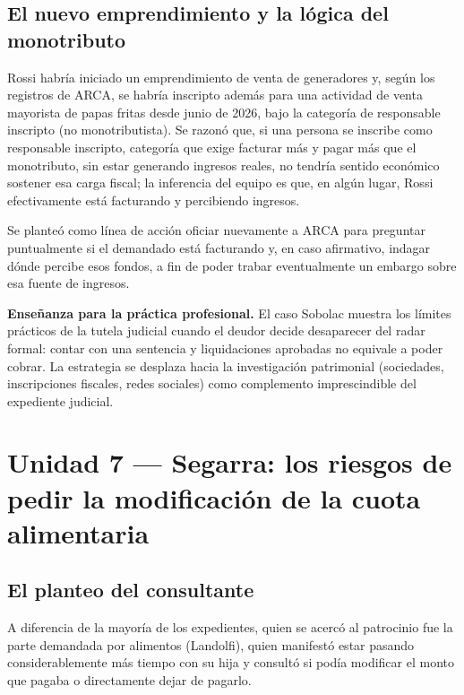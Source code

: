 \documentclass[12pt,oneside]{book}
\begin{document}
\subsection{El nuevo emprendimiento y la lógica del monotributo}

Rossi habría iniciado un emprendimiento de venta de generadores y, según los registros de ARCA, se habría inscripto además para una actividad de venta mayorista de papas fritas desde junio de 2026, bajo la categoría de responsable inscripto (no monotributista). Se razonó que, si una persona se inscribe como responsable inscripto, categoría que exige facturar más y pagar más que el monotributo, sin estar generando ingresos reales, no tendría sentido económico sostener esa carga fiscal; la inferencia del equipo es que, en algún lugar, Rossi efectivamente está facturando y percibiendo ingresos.

Se planteó como línea de acción oficiar nuevamente a ARCA para preguntar puntualmente si el demandado está facturando y, en caso afirmativo, indagar dónde percibe esos fondos, a fin de poder trabar eventualmente un embargo sobre esa fuente de ingresos.

\begin{note}
\textbf{Enseñanza para la práctica profesional.} El caso Sobolac muestra los límites prácticos de la tutela judicial cuando el deudor decide desaparecer del radar formal: contar con una sentencia y liquidaciones aprobadas no equivale a poder cobrar. La estrategia se desplaza hacia la investigación patrimonial (sociedades, inscripciones fiscales, redes sociales) como complemento imprescindible del expediente judicial.
\end{note}

\section{Unidad 7 --- Segarra: los riesgos de pedir la modificación de la cuota alimentaria}

\subsection{El planteo del consultante}

A diferencia de la mayoría de los expedientes, quien se acercó al patrocinio fue la parte demandada por alimentos (Landolfi), quien manifestó estar pasando considerablemente más tiempo con su hija y consultó si podía modificar el monto que pagaba o directamente dejar de pagarlo.
\end{document}
